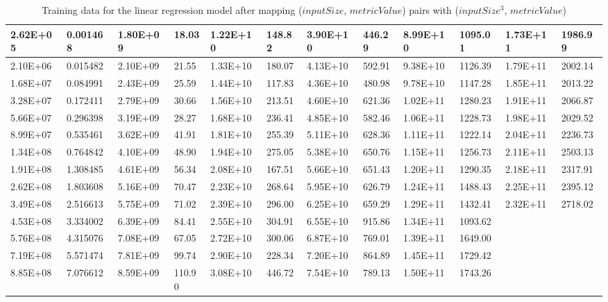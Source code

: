 \begin{table}[H]
\begin{center}
{\begin{tabular}{|l|l|l|l|l|l|l|l|l|l|l|l|}
                2.62E+05 & 0.001468 & 1.80E+09 & 18.03 & 1.22E+10 & 148.82 & 3.90E+10 & 446.29 & 8.99E+10 & 1095.01 & 1.73E+11 & 1986.99 \\ \hline
                2.10E+06 & 0.015482 & 2.10E+09 & 21.55 & 1.33E+10 & 180.07 & 4.13E+10 & 592.91 & 9.38E+10 & 1126.39 & 1.79E+11 & 2002.14 \\ \hline
                1.68E+07 & 0.084991 & 2.43E+09 & 25.59 & 1.44E+10 & 117.83 & 4.36E+10 & 480.98 & 9.78E+10 & 1147.28 & 1.85E+11 & 2013.22 \\ \hline
                3.28E+07 & 0.172411 & 2.79E+09 & 30.66 & 1.56E+10 & 213.51 & 4.60E+10 & 621.36 & 1.02E+11 & 1280.23 & 1.91E+11 & 2066.87 \\ \hline
                5.66E+07 & 0.296398 & 3.19E+09 & 28.27 & 1.68E+10 & 236.41 & 4.85E+10 & 582.46 & 1.06E+11 & 1228.73 & 1.98E+11 & 2029.52 \\ \hline
                8.99E+07 & 0.535461 & 3.62E+09 & 41.91 & 1.81E+10 & 255.39 & 5.11E+10 & 628.36 & 1.11E+11 & 1222.14 & 2.04E+11 & 2236.73 \\ \hline
                1.34E+08 & 0.764842 & 4.10E+09 & 48.90 & 1.94E+10 & 275.05 & 5.38E+10 & 650.76 & 1.15E+11 & 1256.73 & 2.11E+11 & 2503.13 \\ \hline
                1.91E+08 & 1.308485 & 4.61E+09 & 56.34 & 2.08E+10 & 167.51 & 5.66E+10 & 651.43 & 1.20E+11 & 1290.35 & 2.18E+11 & 2317.91 \\ \hline
                2.62E+08 & 1.803608 & 5.16E+09 & 70.47 & 2.23E+10 & 268.64 & 5.95E+10 & 626.79 & 1.24E+11 & 1488.43 & 2.25E+11 & 2395.12 \\ \hline
                3.49E+08 & 2.516613 & 5.75E+09 & 71.02 & 2.39E+10 & 296.00 & 6.25E+10 & 659.29 & 1.29E+11 & 1432.41 & 2.32E+11 & 2718.02 \\ \hline
                4.53E+08 & 3.334002 & 6.39E+09 & 84.41 & 2.55E+10 & 304.91 & 6.55E+10 & 915.86 & 1.34E+11 & 1093.62 & &         \\ \hline
                5.76E+08 & 4.315076 & 7.08E+09 & 67.05 & 2.72E+10 & 300.06 & 6.87E+10 & 769.01 & 1.39E+11 & 1649.00 & &         \\ \hline
                7.19E+08 & 5.571474 & 7.81E+09 & 99.74 & 2.90E+10 & 228.34 & 7.20E+10 & 864.89 & 1.45E+11 & 1729.42 & &         \\ \hline
                8.85E+08 & 7.076612 & 8.59E+09 & 110.90 & 3.08E+10 & 446.72 & 7.54E+10 & 789.13 & 1.50E+11 & 1743.26 & &         \\ \hline
            \end{tabular}
        }
    \end{center}
    \caption{Training data for the linear regression model after mapping ($inputSize$, $metricValue$) pairs with ($inputSize^3$, $metricValue$)}
\end{table}


